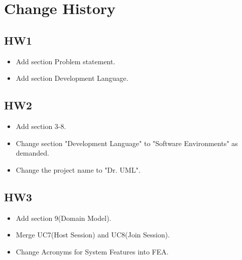 \documentclass[12pt]{article}
\begin{document}
    \begin{CJK*}{UTF8}{bsmi} %
        \maketitlepage
    \end{CJK*}





    \section{Change History}

    \subsection{HW1}
    \begin{itemize}
        \item Add section Problem statement.
        \item Add section Development Language.
    \end{itemize}

    \subsection{HW2}

    \begin{itemize}
        \item Add section 3-8.
        \item Change section "Development Language" to "Software Environments" as demanded.
        \item Change the project name to "Dr. UML".
    \end{itemize}

    \subsection{HW3}
    \begin{itemize}
        \item Add section 9(Domain Model).
        \item Merge UC7(Host Session) and UC8(Join Session).
        \item Change Acronyms for System Features into FEA.
    \end{itemize}
\end{document}
